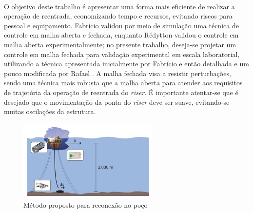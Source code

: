 \paragraph{} O objetivo deste trabalho é apresentar uma forma mais eficiente de realizar a operação de reentrada, economizando tempo e recursos, evitando riscos para pessoal e equipamento. Fabrício \cite{fabricioIFAC} validou por meio de simulação uma técnica de controle em malha aberta e fechada, enquanto Rédytton \cite{redytton} validou o controle em malha aberta experimentalmente; no presente trabalho, deseja-se projetar um controle em malha fechada para validação experimental em escala laboratorial, utilizando a técnica apresentada inicialmente por Fabrício \cite{fabricioIFAC} e então detalhada e um pouco modificada por Rafael \cite{rafaelMestrado}. A malha fechada visa a resistir perturbações, sendo uma técnica mais robusta que a malha aberta para atender aos requisitos de trajetória da operação de reentrada do \textit{riser}. É importante atentar-se que é desejado que o movimentação da ponta do \textit{riser} deve ser suave, evitando-se muitas oscilações da estrutura.

\begin{figure}[ht!]
\centering
  \includegraphics[width=7cm]{figs/introducao/posicionamentoProposto}
  \caption{Método proposto para reconexão no poço \cite{redytton} \label{posicionamentoProposto}}
\end{figure}

